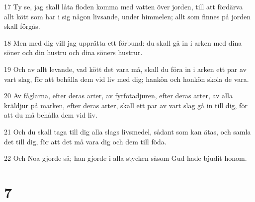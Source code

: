 \par 17 Ty se, jag skall låta floden komma med vatten över jorden, till att fördärva allt kött som har i sig någon livsande, under himmelen; allt som finnes på jorden skall förgås.
\par 18 Men med dig vill jag upprätta ett förbund: du skall gå in i arken med dina söner och din hustru och dina söners hustrur.
\par 19 Och av allt levande, vad kött det vara må, skall du föra in i arken ett par av vart slag, för att behålla dem vid liv med dig; hankön och honkön skola de vara.
\par 20 Av fåglarna, efter deras arter, av fyrfotadjuren, efter deras arter, av alla kräldjur på marken, efter deras arter, skall ett par av vart slag gå in till dig, för att du må behålla dem vid liv.
\par 21 Och du skall taga till dig alla slags livsmedel, sådant som kan ätas, och samla det till dig, för att det må vara dig och dem till föda.
\par 22 Och Noa gjorde så; han gjorde i alla stycken såsom Gud hade bjudit honom.

\chapter{7}

